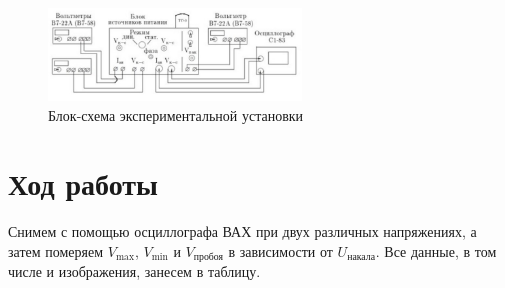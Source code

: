 \documentclass[a4paper, 12pt]{article}%
\begin{document}
\begin{figure}[h]
\begin{center}
\includegraphics[width = 0.6\textwidth]{3.jpg}
\caption{Блок-схема экспериментальной установки}
\end{center}
\end{figure}
\newpage
\section*{Ход работы}
Снимем с помощью осциллографа ВАХ при двух различных напряжениях, а затем померяем $V_{\max}$, $V_{\min}$ и $V_{\text{пробоя}}$ в зависимости от $U_{\text{накала}}$. Все данные, в том числе и изображения, занесем в таблицу.
\end{document}
